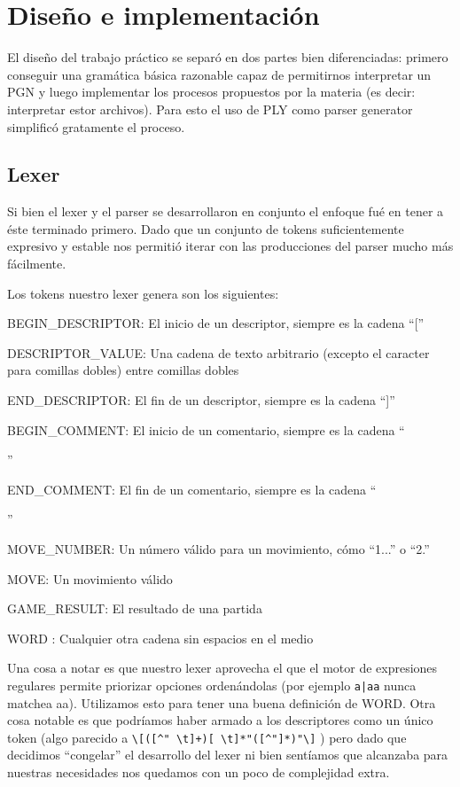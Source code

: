 \section{Diseño e implementación}

El diseño del trabajo práctico se separó en dos partes bien diferenciadas: primero conseguir una gramática básica razonable capaz de permitirnos interpretar un PGN y luego implementar los procesos propuestos por la materia (es decir: interpretar estor archivos). Para esto el uso de PLY como parser generator simplificó gratamente el proceso.

\subsection{Lexer}

Si bien el lexer y el parser se desarrollaron en conjunto el enfoque fué en tener a éste terminado primero. Dado que un conjunto de tokens suficientemente expresivo y estable nos permitió iterar con las producciones del parser mucho más fácilmente.

Los tokens nuestro lexer genera son los siguientes:
\begin{itemize}
    \item BEGIN\_DESCRIPTOR: El inicio de un descriptor, siempre es la cadena ``[''
    \item DESCRIPTOR\_VALUE: Una cadena de texto arbitrario (excepto el caracter para comillas dobles) entre comillas dobles
    \item END\_DESCRIPTOR: El fin de un descriptor, siempre es la cadena ``]''
    \item BEGIN\_COMMENT: El inicio de un comentario, siempre es la cadena ``{''
    \item END\_COMMENT: El fin de un comentario, siempre es la cadena ``}''
    \item MOVE\_NUMBER: Un número válido para un movimiento, cómo ``1...'' o ``2.''
    \item MOVE: Un movimiento válido
    \item GAME\_RESULT: El resultado de una partida
    \item WORD : Cualquier otra cadena sin espacios en el medio
\end{itemize}
    
    
Una cosa a notar es que nuestro lexer aprovecha el que el motor de expresiones regulares permite priorizar opciones ordenándolas (por ejemplo \verb/a|aa/ nunca matchea aa). Utilizamos esto para tener una buena definición de WORD. Otra cosa notable es que podríamos haber armado a los descriptores como un único token (algo parecido a \verb/\[([^" \t]+)[ \t]*"([^"]*)"\]/ )  pero dado que decidimos ``congelar'' el desarrollo del lexer ni bien sentíamos que alcanzaba para nuestras necesidades nos quedamos con un poco de complejidad extra.

